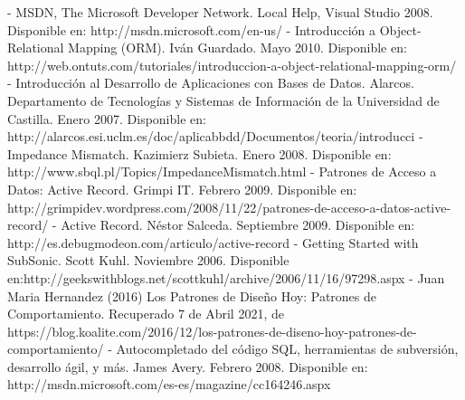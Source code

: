 \documentclass[twoside,twocolumn]{article}
\begin{document}
\begin{thebibliography}{XXX0000}
	\bibitem - MSDN, The Microsoft Developer Network. Local Help, Visual Studio 2008. Disponible en: http://msdn.microsoft.com/en-us/
	\bibitem - Introducción a Object-Relational Mapping (ORM). Iván Guardado. Mayo 2010. Disponible en: http://web.ontuts.com/tutoriales/introduccion-a-object-relational-mapping-orm/
	\bibitem - Introducción al Desarrollo de Aplicaciones con Bases de Datos. Alarcos. Departamento de Tecnologías y Sistemas de Información de la Universidad de Castilla. Enero 2007. Disponible en: http://alarcos.esi.uclm.es/doc/aplicabbdd/Documentos/teoria/introducci%
	\bibitem - Impedance Mismatch. Kazimierz Subieta. Enero 2008. Disponible en: http://www.sbql.pl/Topics/ImpedanceMismatch.html
	\bibitem - Patrones de Acceso a Datos: Active Record. Grimpi IT. Febrero 2009. Disponible en: http://grimpidev.wordpress.com/2008/11/22/patrones-de-acceso-a-datos-active-record/
	\bibitem - Active Record. Néstor Salceda. Septiembre 2009. Disponible en: http://es.debugmodeon.com/articulo/active-record
	\bibitem - Getting Started with SubSonic. Scott Kuhl. Noviembre 2006. Disponible en:http://geekswithblogs.net/scottkuhl/archive/2006/11/16/97298.aspx
	\bibitem - Juan Maria Hernandez (2016) Los Patrones de Diseño Hoy: Patrones de Comportamiento. Recuperado 7 de Abril 2021, de https://blog.koalite.com/2016/12/los-patrones-de-diseno-hoy-patrones-de-comportamiento/
	\bibitem - Autocompletado del código SQL, herramientas de subversión, desarrollo ágil, y más. James Avery. Febrero 2008. Disponible en: http://msdn.microsoft.com/es-es/magazine/cc164246.aspx
	\end{thebibliography}

\end{document}
